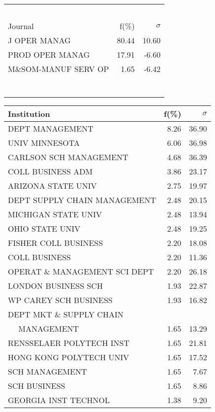 \documentclass[a4paper,11pt]{report}
\begin{document}
\begin{landscape}
\begin{table}[!ht]
{\begin{tabular}{|l r r|}
 &  & \\
 &  & \\
 &  & \\
 &  & \\
 &  & \\
\hline
\hline
Journal & f(\%) & $\sigma$\\
\hline
J OPER MANAG & 80.44 & 10.60\\
PROD OPER MANAG & 17.91 & -6.60\\
M\&SOM-MANUF SERV OP & 1.65 & -6.42\\
 &  & \\
 &  & \\
 &  & \\
 &  & \\
 &  & \\
 &  & \\
 &  & \\
\hline
\end{tabular}
}
{\scriptsize\begin{tabular}{|l r r|}
\hline
Institution & f(\%) & $\sigma$\\
\hline
DEPT MANAGEMENT & 8.26 & 36.90\\
UNIV MINNESOTA & 6.06 & 36.98\\
CARLSON SCH MANAGEMENT & 4.68 & 36.39\\
COLL BUSINESS ADM & 3.86 & 23.17\\
ARIZONA STATE UNIV & 2.75 & 19.97\\
DEPT SUPPLY CHAIN MANAGEMENT & 2.48 & 20.15\\
MICHIGAN STATE UNIV & 2.48 & 13.94\\
OHIO STATE UNIV & 2.48 & 19.25\\
FISHER COLL BUSINESS & 2.20 & 18.08\\
COLL BUSINESS & 2.20 & 11.36\\
OPERAT \& MANAGEMENT SCI DEPT & 2.20 & 26.18\\
LONDON BUSINESS SCH & 1.93 & 22.87\\
WP CAREY SCH BUSINESS & 1.93 & 16.82\\
DEPT MKT \& SUPPLY CHAIN &  & \\
$\quad$ MANAGEMENT & 1.65 & 13.29\\
RENSSELAER POLYTECH INST & 1.65 & 21.81\\
HONG KONG POLYTECH UNIV & 1.65 & 17.52\\
SCH MANAGEMENT & 1.65 & 7.67\\
SCH BUSINESS & 1.65 & 8.86\\
GEORGIA INST TECHNOL & 1.38 & 9.20\\

\end{tabular}}
\end{table}
\end{landscape}
\end{document}
